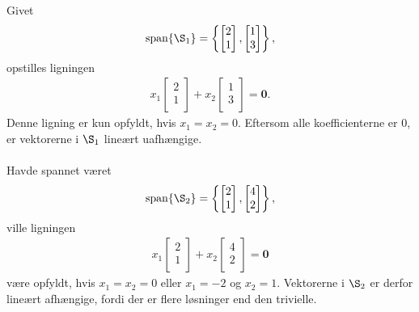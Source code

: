 \begin{eks}\label{fisk}
Givet
\begin{align*}
\text{span}\{\S_1 \} =
\left\{ 
\begin{bmatrix}
           2 \\
           1 \\
\end{bmatrix} 
,
\begin{bmatrix}
           1 \\
           3 \\
\end{bmatrix}
\right\},
\end{align*}
opstilles ligningen  
%
\begin{align*}
x_1 
\begin{bmatrix}
           2 \\
           1 \\
\end{bmatrix} 
+ x_2
\begin{bmatrix}
           1 \\
           3 \\
\end{bmatrix}
= \mathbf{0}.
\end{align*}
%
Denne ligning er kun opfyldt, hvis $x_1=x_2=0$. 
Eftersom alle koefficienterne er $0$, er vektorerne i $\S_1$ lineært uafhængige.
\\\\
Havde spannet været 
\begin{align*}
\text{span}\{\S_2 \} =
\left\{ 
\begin{bmatrix}
           2 \\
           1 \\
\end{bmatrix} 
,
\begin{bmatrix}
           4 \\
           2 \\
\end{bmatrix}
\right\},
\end{align*}
%
ville ligningen 
%
\begin{align*}
x_1 
\begin{bmatrix}
           2 \\
           1 \\
\end{bmatrix} 
+ x_2
\begin{bmatrix}
           4 \\
           2 \\
\end{bmatrix}
= \mathbf{0}
\end{align*}
%
være opfyldt, hvis $x_1=x_2=0$ eller $x_1=-2$ og $x_2=1$. 
Vektorerne i $\S_2$ er derfor lineært afhængige, fordi der er flere løsninger end den trivielle.
%
\end{eks}

